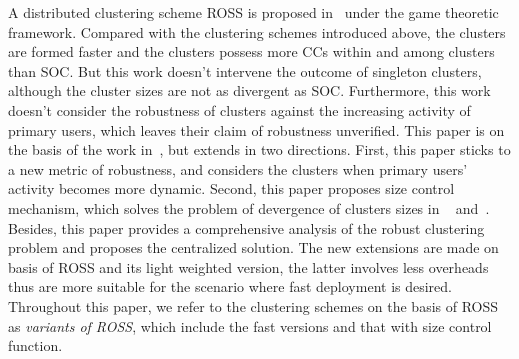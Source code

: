\documentclass[10pt,journal,compsoc]{IEEEtran}
\theoremstyle{mytheoremstyle}
\theoremstyle{mytheoremstyle}
\theoremstyle{mytheoremstyle}
\newcommand{\ie}{i.e., }
\begin{document}
A distributed clustering scheme ROSS is proposed in~\cite{Li11_ROSS} under the game theoretic framework. 
Compared with the clustering schemes introduced above, the clusters are formed faster and the clusters possess more CCs within and among clusters than SOC.
But this work doesn't intervene the outcome of singleton clusters, although the cluster sizes are not as divergent as SOC.
Furthermore, this work doesn't consider the robustness of clusters against the increasing activity of primary users, which leaves their claim of robustness unverified.
%
This paper is on the basis of the work in~\cite{Li11_ROSS}, but extends in two directions.
First, this paper sticks to a new metric of robustness, and considers the clusters when primary users' activity becomes more dynamic.
Second, this paper proposes size control mechanism, which solves the problem of devergence of clusters sizes in ~\cite{Li11_ROSS} and~\cite{LIU_TMC11_2}.
Besides, this paper provides a comprehensive analysis of the robust clustering problem and proposes the centralized solution. 
%
The new extensions are made on basis of ROSS and its light weighted version, the latter involves less overheads thus are more suitable for the scenario where fast deployment is desired.
Throughout this paper, we refer to the clustering schemes on the basis of ROSS as \textit{variants of ROSS}, which include the fast versions and that with size control function.
\end{document}
